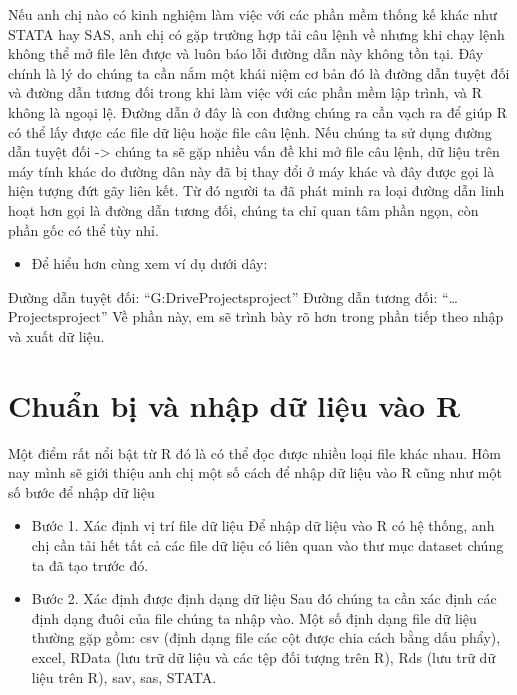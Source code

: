 \documentclass[
]{book}
\providecommand{\tightlist}{%
  \setlength{\itemsep}{0pt}\setlength{\parskip}{0pt}}
\theoremstyle{definition}
\theoremstyle{definition}
\theoremstyle{definition}
\theoremstyle{definition}
\theoremstyle{remark}
\begin{document}
Nếu anh chị nào có kinh nghiệm làm việc với các phần mềm thống kế khác như STATA hay SAS, anh chị có gặp trường hợp tải câu lệnh về nhưng khi chạy lệnh không thể mở file lên được và luôn báo lỗi đường dẫn này không tồn tại. Đây chính là lý do chúng ta cần nắm một khái niệm cơ bản đó là đường dẫn tuyệt đối và đường dẫn tương đối trong khi làm việc với các phần mềm lập trình, và R không là ngoại lệ. Đường dẫn ở đây là con đường chúng ra cần vạch ra để giúp R có thể lấy được các file dữ liệu hoặc file câu lệnh. Nếu chúng ta sử dụng đường dẫn tuyệt đối -\textgreater{} chúng ta sẽ gặp nhiều vấn đề khi mở file câu lệnh, dữ liệu trên máy tính khác do đường dân này đã bị thay đổi ở máy khác và đây được gọi là hiện tượng đứt gãy liên kết. Từ đó người ta đã phát minh ra loại đường dẫn linh hoạt hơn gọi là đường dẫn tương đối, chúng ta chỉ quan tâm phần ngọn, còn phần gốc có thể tùy nhỉ.

\begin{itemize}
\tightlist
\item
  Để hiểu hơn cùng xem ví dụ dưới dây:
\end{itemize}

Đường dẫn tuyệt đối: ``G:\My Drive\Summer Projects\education project'' Đường dẫn tương đối: ``\ldots{}\Summer Projects\education project'' Về phần này, em sẽ trình bày rõ hơn trong phần tiếp theo nhập và xuất dữ liệu.

\hypertarget{chuux1ea9n-bux1ecb-vuxe0-nhux1eadp-dux1eef-liux1ec7u-vuxe0o-r}{%
\section{Chuẩn bị và nhập dữ liệu vào R}\label{chuux1ea9n-bux1ecb-vuxe0-nhux1eadp-dux1eef-liux1ec7u-vuxe0o-r}}

Một điểm rất nổi bật từ R đó là có thể đọc được nhiều loại file khác nhau. Hôm nay mình sẽ giới thiệu anh chị một số cách để nhập dữ liệu vào R cũng như một số bước để nhập dữ liệu

\begin{itemize}
\item
  Bước 1. Xác định vị trí file dữ liệu Để nhập dữ liệu vào R có hệ thống, anh chị cần tải hết tất cả các file dữ liệu có liên quan vào thư mục dataset chúng ta đã tạo trước đó.
\item
  Bước 2. Xác định được định dạng dữ liệu Sau đó chúng ta cần xác định các định dạng đuôi của file chúng ta nhập vào. Một số định dạng file dữ liệu thường gặp gồm: csv (định dạng file các cột được chia cách bằng dấu phẩy), excel, RData (lưu trữ dữ liệu và các tệp đối tượng trên R), Rds (lưu trữ dữ liệu trên R), sav, sas, STATA.
\end{itemize}
\end{document}
